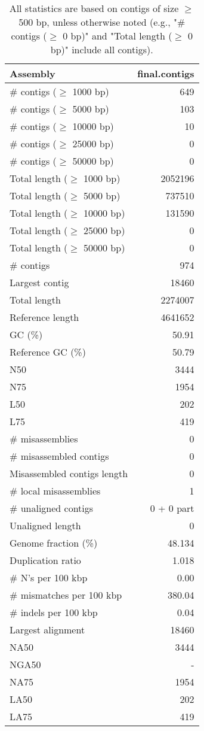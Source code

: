 \documentclass[12pt,a4paper]{article}
\begin{document}
\begin{table}[ht]
\begin{center}
\caption{All statistics are based on contigs of size $\geq$ 500 bp, unless otherwise noted (e.g., "\# contigs ($\geq$ 0 bp)" and "Total length ($\geq$ 0 bp)" include all contigs).}
\begin{tabular}{|l*{1}{|r}|}
\hline
Assembly & final.contigs \\ \hline
\# contigs ($\geq$ 1000 bp) & 649 \\ \hline
\# contigs ($\geq$ 5000 bp) & 103 \\ \hline
\# contigs ($\geq$ 10000 bp) & 10 \\ \hline
\# contigs ($\geq$ 25000 bp) & 0 \\ \hline
\# contigs ($\geq$ 50000 bp) & 0 \\ \hline
Total length ($\geq$ 1000 bp) & 2052196 \\ \hline
Total length ($\geq$ 5000 bp) & 737510 \\ \hline
Total length ($\geq$ 10000 bp) & 131590 \\ \hline
Total length ($\geq$ 25000 bp) & 0 \\ \hline
Total length ($\geq$ 50000 bp) & 0 \\ \hline
\# contigs & 974 \\ \hline
Largest contig & 18460 \\ \hline
Total length & 2274007 \\ \hline
Reference length & 4641652 \\ \hline
GC (\%) & 50.91 \\ \hline
Reference GC (\%) & 50.79 \\ \hline
N50 & 3444 \\ \hline
N75 & 1954 \\ \hline
L50 & 202 \\ \hline
L75 & 419 \\ \hline
\# misassemblies & 0 \\ \hline
\# misassembled contigs & 0 \\ \hline
Misassembled contigs length & 0 \\ \hline
\# local misassemblies & 1 \\ \hline
\# unaligned contigs & 0 + 0 part \\ \hline
Unaligned length & 0 \\ \hline
Genome fraction (\%) & 48.134 \\ \hline
Duplication ratio & 1.018 \\ \hline
\# N's per 100 kbp & 0.00 \\ \hline
\# mismatches per 100 kbp & 380.04 \\ \hline
\# indels per 100 kbp & 0.04 \\ \hline
Largest alignment & 18460 \\ \hline
NA50 & 3444 \\ \hline
NGA50 & - \\ \hline
NA75 & 1954 \\ \hline
LA50 & 202 \\ \hline
LA75 & 419 \\ \hline
\end{tabular}
\end{center}
\end{table}
\end{document}

